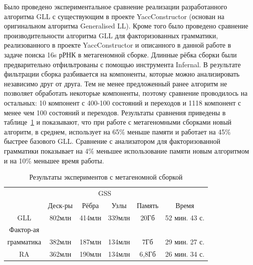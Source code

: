 \documentclass[14pt]{matmex-diploma-custom}
\begin{document}
    Было проведено экспериментальное сравнение реализации разработанного алгоритма GLL с
    существующим в проекте YaccConstructor (основан на оригинальном алгоритма Generalised LL). 
    Кроме того было проведено сравнение производительности алгоритма GLL для факторизованных грамматики, реализованного в 
    проекте YaccConstructor и описанного в данной 
    работе в задаче поиска 16s рРНК в метагеномной сборке. Длинные рёбка сборки были предварительно отфильтрованы с помощью
    инструмента Infernal. В результате фильтрации сборка разбивается на компоненты, которые можно анализировать независимо друг от
    друга. Тем не менее предложенный ранее алгоритм не позволяет обработать некоторые компоненты, поэтому сравнение проводилось
    на остальных: 10 компонент с 400-100 состояний и переходов и 1118 компонент с менее чем 100 состояний и переходов.
    Результаты сравнения приведены в таблице~\ref{expTable1} и показывают, что при работе с метагеномными сборками новый
    алгоритм, в среднем, использует на 65\% меньше памяти и работает на 45\% быстрее базового GLL. Сравнение с анализатором 
    для факторизованной грамматики показывает на 4\% меньшее использование памяти новым алгоритмом и на 10\% меньшее время работы.
    
    \begin{table}[h]
        \begin{center}
        \begin{tabular}{ | c | c | c | c | c | c |}
            \hline
            & &\multicolumn{2}{c|}{GSS} & & \\
            \cline{3-4}
                              & Деск-ры & Рёбра   & Узлы   & Память& Время   \\ \hline
            GLL               &  802млн &  414млн & 339млн  & 20Гб & 52 мин. 43 с.  \\ \hline
            Фактор-ая &&&&&\\
            грамматика        &  382млн &  187млн & 134млн & 7Гб & 29 мин. 27 с.  \\ \hline
            RA                &  362млн &  190млн & 134млн & 6,8Гб & 26 мин. 34 с.  \\ \hline %
        \end{tabular}
        \caption{Результаты экспериментов с метагеномной сборкой}
        \label{expTable1}
        \end{center}
    \end{table}
	
\end{document}
